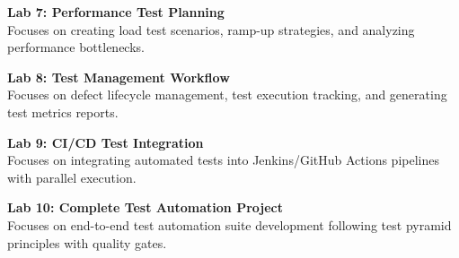 \vspace{0.2cm}

\noindent\textbf{Lab 7: Performance Test Planning} \\
Focuses on creating load test scenarios, ramp-up strategies, and analyzing performance bottlenecks.

\vspace{0.2cm}

\noindent\textbf{Lab 8: Test Management Workflow} \\
Focuses on defect lifecycle management, test execution tracking, and generating test metrics reports.

\vspace{0.2cm}

\noindent\textbf{Lab 9: CI/CD Test Integration} \\
Focuses on integrating automated tests into Jenkins/GitHub Actions pipelines with parallel execution.

\vspace{0.2cm}

\noindent\textbf{Lab 10: Complete Test Automation Project} \\
Focuses on end-to-end test automation suite development following test pyramid principles with quality gates.

\vspace{0.2cm}

\newpage
{}
